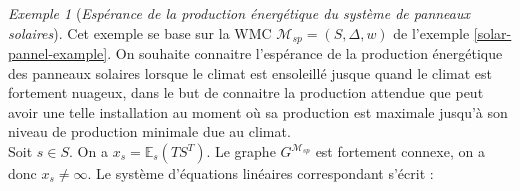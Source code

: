 \documentclass[12pt,a4paper]{report}
\theoremstyle{definition}%
\theoremstyle{remark}
\newtheorem{example}{Exemple}[chapter]
\begin{document}
\begin{example}[\textit{Espérance de la production énergétique du système de panneaux solaires}]
	Cet exemple se base sur la WMC $\mathcal{M}_{sp} = (S, \Delta, w)$ de l'exemple \ref{solar-pannel-example}. On souhaite connaitre l'espérance de la production énergétique des panneaux solaires lorsque le climat est ensoleillé jusque quand le climat est fortement nuageux, dans le but de connaitre la production attendue que peut avoir une telle installation au moment où sa production est maximale jusqu'à son niveau de production minimale due au climat.\\
	Soit $s \in S$. On a $x_s = \mathbb{E}_s(TS^T)$. Le graphe $G^{\mathcal{M}_{sp}}$ est fortement connexe, on a donc $x_s \neq \infty$. Le système d'équations linéaires correspondant s'écrit :


\end{example}
\end{document}

